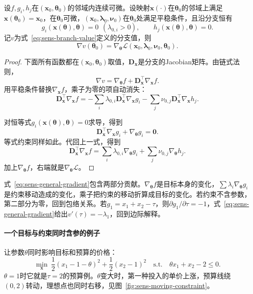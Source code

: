 \begin{theorem}[分支值对参数的导数]
\label{thm:sens-general-branch}
设$f,g_i,h_j$在$(\bm{x}_0,\bm{\theta}_0)$的邻域内连续可微。设映射$\bm{x}(\cdot)$在$\bm{\theta}_0$的邻域上满足$\bm{x}(\bm{\theta}_0)=\bm{x}_0$，在$\bm{\theta}_0$可微，$(\bm{x}_0,\bm{\lambda}_0,\bm{\nu}_0)$在$\bm{\theta}_0$处满足平稳条件，且沿分支恒有
\begin{equation}
 g_i(\bm{x}(\bm{\theta}),\bm{\theta})=0\ \ (\lambda_{0,i}>0),\qquad
 h_j(\bm{x}(\bm{\theta}),\bm{\theta})=0.
 \label{eq:sens-active-held}
\end{equation}
记$v$为式~\eqref{eq:sens-branch-value}定义的分支值，则
\begin{equation}
 \nabla v(\bm{\theta}_0)=\nabla_{\bm{\theta}}\mathcal{L}(\bm{x}_0,\bm{\lambda}_0,\bm{\nu}_0,\bm{\theta}_0).
 \label{eq:sens-general-gradient}
\end{equation}
\end{theorem}

\begin{proof}
下面所有函数都在$(\bm{x}_0,\bm{\theta}_0)$取值，$\bm{D}_{\bm{x}}$是分支的Jacobian矩阵。由链式法则，
\[
 \nabla v=\nabla_{\bm{\theta}}f+\bm{D}_{\bm{x}}^{\top}\nabla_{\bm{x}}f.
\]
用平稳条件替换$\nabla_{\bm{x}}f$，乘子为零的项自动消失：
\[
 \bm{D}_{\bm{x}}^{\top}\nabla_{\bm{x}}f=-\sum_{i}\lambda_{0,i}\bm{D}_{\bm{x}}^{\top}\nabla_{\bm{x}}g_i-\sum_j\nu_{0,j}\bm{D}_{\bm{x}}^{\top}\nabla_{\bm{x}}h_j.
\]

对恒等式$g_i(\bm{x}(\bm{\theta}),\bm{\theta})=0$求导，得到
\[
 \bm{D}_{\bm{x}}^{\top}\nabla_{\bm{x}}g_i+\nabla_{\bm{\theta}}g_i=\bm{0}.
\]
等式约束同样如此。代回上一式，得到
\[
 \bm{D}_{\bm{x}}^{\top}\nabla_{\bm{x}}f=\sum_i\lambda_{0,i}\nabla_{\bm{\theta}}g_i+\sum_j\nu_{0,j}\nabla_{\bm{\theta}}h_j.
\]
加上$\nabla_{\bm{\theta}}f$，右端就是$\nabla_{\bm{\theta}}\mathcal{L}$。
\end{proof}

式~\eqref{eq:sens-general-gradient}包含两部分贡献。$\nabla_{\bm{\theta}}f$是目标本身的变化，$\sum\lambda_i\nabla_{\bm{\theta}}g_i$是约束移动造成的变化，乘子把约束的移动折算成目标的变化。若约束不含参数，第二部分为零，回到包络关系。若$g_1=x_1+x_2-\tau$，则$\partial g_1/\partial\tau=-1$，式~\eqref{eq:sens-general-gradient}给出$v'(\tau)=-\lambda_1$，回到边际解释。

\paragraph{一个目标与约束同时含参的例子}
让参数$\theta$同时影响目标和预算的价格：
\[
 \min_{\bm{x}}\ \frac12(x_1-1-\theta)^2+\frac12(x_2-1)^2
 \quad\text{s.t.}\quad \theta x_1+x_2-2\leq0.
\]
$\theta=1$时它就是$\tau=2$的预算例。$\theta$变大时，第一种投入的单价上涨，预算线绕$(0,2)$转动，理想点也同时右移，见图~\ref{fig:sens-moving-constraint}。

